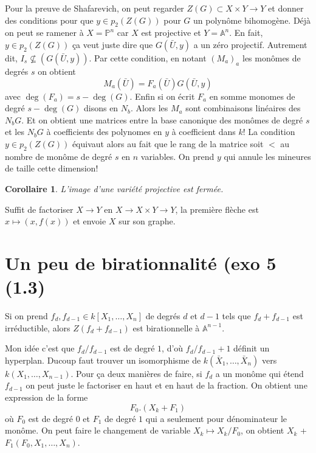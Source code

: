 \documentclass[a4paper,12pt]{book}
\newcommand{\A}{\mathbb{A}}
\renewcommand{\Pr}{\mathbb{P}}
\theoremstyle{plain}
\newtheorem{cor}[subsection]{Corollaire}
\theoremstyle{definition}
\theoremstyle{remark}
\begin{document}
Pour la preuve de Shafarevich, on peut
regarder $Z(G)\subset X\times Y\to Y$ et donner des conditions pour que
$y\in p_2(Z(G))$ pour $G$ un polynôme bihomogène. Déjà on peut se ramener
à $X=\Pr^n$ car $X$ est projective et $Y=\A^n$. En fait, 
$y\in p_2(Z(G))$ ça veut juste dire que $G(\bar U, y)$ a un zéro 
projectif. Autrement dit, $I_s\nsubseteq (G(\bar U,y))$. Par cette 
condition, en notant $(M_{a})_a$ les monômes de degrés $s$ on obtient
\[M_a(\bar U)=F_a(\bar U)G(\bar U, y)\]
avec $\deg(F_a)=s-\deg(G)$. Enfin si on écrit $F_a$ en somme monomes
de degré $s-\deg(G)$ disons en $N_b$. Alors les $M_a$ sont combinaisons
linéaires des $N_bG$. Et on obtient une matrices entre la base canonique
des monômes de degré $s$ et les $N_bG$ à coefficients des polynomes en
$y$ à coefficient dans $k$! La condition $y\in p_2(Z(G))$ équivaut alors
au fait que le rang de la matrice soit $<$ au nombre de monôme de 
degré $s$ en $n$ variables. On prend $y$ qui annule les mineures de 
taille cette dimension!

\begin{cor}
    L'image d'une variété projective est fermée.
\end{cor}

Suffit de factoriser $X\to Y$ en $X\to X\times Y\to Y$, la première 
flèche est $x\mapsto (x, f(x))$ et envoie $X$ sur son graphe.


\section{Un peu de birationnalité (exo 5 (1.3)}
Si on prend $f_d,f_{d-1}\in k[X_1,\ldots, X_n]$ de degrés $d$ et $d-1$
tels que $f_d+f_{d-1}$ est irréductible, alors $Z(f_d+f_{d-1})$ est 
birationnelle à $\A^{n-1}$. 

Mon idée c'est que $f_d/f_{d-1}$ est de degré $1$, d'où 
$f_d/f_{d-1} + 1$ définit un hyperplan. Ducoup faut trouver un 
isomorphisme de $k(\bar X_1, \ldots, \bar X_n)$ vers 
$k(X_1, \ldots, X_{n-1})$. Pour ça deux manières de faire, si $f_d$ 
a un monôme qui étend $f_{d-1}$ on peut juste le factoriser en haut
et en haut de la fraction. On obtient une expression de la forme 
\[F_0.(X_k+F_1)\]
où $F_0$ est de degré $0$ et $F_1$ de degré $1$ qui a seulement pour 
dénominateur le monôme. On peut faire le changement de variable
$X_k\mapsto X_k/F_0 $, on obtient $X_k$ + $F_1(F_0, X_1,\ldots, X_n)$.
\end{document}
